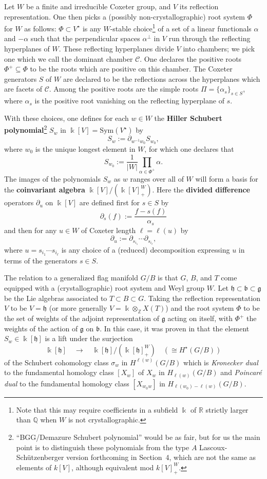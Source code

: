 \documentclass[12pt,dvips]{amsart}
\theoremstyle{plain}
\theoremstyle{definition}
\theoremstyle{remark}
\numberwithin{equation}{section}
\def\ZZ{{\mathbb Z}}
\def\QQ{{\mathbb Q}}
\def\RR{{\mathbb R}}
\def\hh{\mathfrak{h}}
\def\bb{\mathfrak{b}}
\def\gg{\mathfrak{g}}
\def\Sym{\mathrm{Sym}}
\begin{document}
Let $W$ be a finite and irreducible Coxeter group, and $V$ its
reflection representation.  One then picks a (possibly
non-crystallographic) root system $\Phi$ for $W$ as follows: $\Phi
\subset V^\star$ is any $W$-stable choice\footnote{Note that this may
require coefficients in a subfield $\Bbbk$ of $\RR$ strictly larger
than $\QQ$ when $W$ is not crystallographic.} of a set of a linear
functionals $\alpha$ and $-\alpha$ such that the perpendicular spaces
$\alpha^\perp$ in $V$ run through the reflecting hyperplanes of $W$.
These reflecting hyperplanes divide $V$ into chambers; we pick one
which we call the dominant chamber $\mathcal{C}$.  One declares the
positive roots $\Phi^+\subseteq\Phi$ to be the roots which are
positive on this chamber.  The Coxeter generators $S$ of $W$ are
declared to be the reflections across the hyperplanes which are facets of
$\mathcal{C}$.  Among the positive roots are the simple roots
$\Pi=\{\alpha_s\}_{s \in S}$, where $\alpha_s$ is the positive root
vanishing on the reflecting hyperplane of $s$.

  With these choices, one defines for each $w\in W$ the {\bf Hiller
Schubert polynomial}\footnote{``BGG/Demazure Schubert polynomial''
would be as fair, but for us the main point is to distinguish these
polynomials from the type $A$ Lascoux-Sch\"{u}tzenberger version
forthcoming in Section~4, which are not the same as elements of
$k[V]$, although equivalent mod $k[V]^W_+$.}
$S_w$ in $\Bbbk[V]=\Sym(V^\star)$ by
$$
S_w := \partial_{w^{-1}w_0} S_{w_0},
$$
where $w_0$ is the unique longest element in $W$,
for which one declares that
$$
S_{w_0} :=  \frac{1}{|W|}\prod_{\alpha \in \Phi^+} \alpha.
$$ 
The images of the polynomials $S_w$ as $w$ ranges over all of $W$ will
form a basis for the {\bf coinvariant algebra}
$\Bbbk[V]/(\Bbbk[V]^W_+)$.  Here the {\bf divided difference}
operators $\partial_u$ on $\Bbbk[V]$ are defined first for $s\in S$ by
$$
\partial_s (f):= \frac{f-s(f)}{\alpha_s}
$$
and then for any $u\in W$ of Coxeter length $\ell=\ell(u)$ by
$$
\partial_u:=\partial_{s_{i_1}} \cdots \partial_{s_{i_\ell}},
$$
where $u=s_{i_1} \cdots s_{i_\ell}$ is any choice of a (reduced)
decomposition expressing $u$ in terms of the generators $s\in S$.


The relation to a generalized flag manifold $G/B$ is that $G$, $B$,
and $T$ come equipped with a (crystallographic) root system and Weyl
group $W$. Let $\hh\subset \bb \subset \gg$ be the Lie algebras associated
to $T\subset B\subset G$.
Taking the reflection representation $V$ to be $V=\hh$ (or
more generally $V=\Bbbk \otimes_\ZZ X(T)$) and the root system $\Phi$
to be the set of weights of the adjoint representation of $\gg$ acting
on itself, with $\Phi^+$ the weights of the action of $\gg$ on
$\bb$.  In this case, it was proven in \cite{BGG,
Demazure} that the element $S_w\in\Bbbk[\hh]$ is a lift under the
surjection
$$
\Bbbk[\hh] \quad \rightarrow \quad \Bbbk[\hh]/(\Bbbk[\hh]^W_+) 
\quad \left( \cong H^\star(G/B) \right)
$$ of the Schubert cohomology class $\sigma_w$ in $H^{\ell(w)}(G/B)$
which is {\it Kronecker dual} to the fundamental homology class
$[X_w]$ of $X_w$ in $H_{\ell(w)}(G/B)$ and {\it Poincar\'e dual} to
the fundamental homology class $[X_{w_0w}]$ in
$H_{\ell(w_0)-\ell(w)}(G/B)$.
\end{document}
